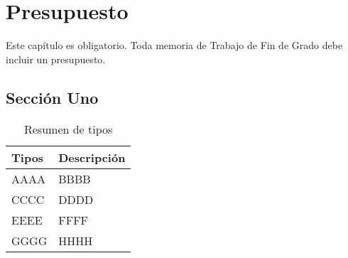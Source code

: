 \chapter{Presupuesto}
\label{ch:presupuesto}

\noindent Este capítulo es obligatorio. Toda memoria de Trabajo de Fin de Grado debe incluir un presupuesto.

\section{Sección Uno}

\begin{table}[htb]
    \begin{center}
        \begin{tabularx}{0.8\textwidth} { X X }
            \toprule
            \textbf{Tipos} & \textbf{Descripción} \\
            \midrule
            AAAA  & BBBB \\
            CCCC  & DDDD \\
            EEEE  & FFFF \\
            GGGG  & HHHH \\
            \bottomrule
        \end{tabularx}
    \end{center}
    \caption{Resumen de tipos}
    \label{tbl:presupuesto}
\end{table}